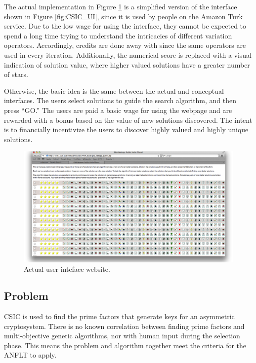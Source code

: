 The actual implementation in Figure \ref{fig:website_UI} is a simplified version of the interface shown in Figure \ref{fig:CSIC_UI}, since it is used by people on the Amazon Turk service.  Due to the low wage for using the interface, they cannot be expected to spend a long time trying to understand the intricacies of different variation operators.  Accordingly, credits are done away with since the same operators are used in every iteration.  Additionally, the numerical score is replaced with a visual indication of solution value, where higher valued solutions have a greater number of stars.

Otherwise, the basic idea is the same between the actual and conceptual interfaces.  The users select solutions to guide the search algorithm, and then press ``GO.''  The users are paid a basic wage for using the webpage and are rewarded with a bonus based on the value of new solutions discovered.  The intent is to financially incentivize the users to discover highly valued and highly unique solutions. 

\begin{figure}[!t]
  \centering
  \includegraphics[width=4.5in]{HollowayWebsiteUI}
  \caption{Actual user inteface website.}
  \label{fig:website_UI}
\end{figure}

\subsection{Problem}\label{sec:problem}

CSIC is used to find the prime factors that generate keys for an asymmetric cryptosystem.  There is no known correlation between finding prime factors and multi-objective genetic algorithms, nor with human input during the selection phase.  This means the problem and algorithm together meet the criteria for the ANFLT to apply. 

